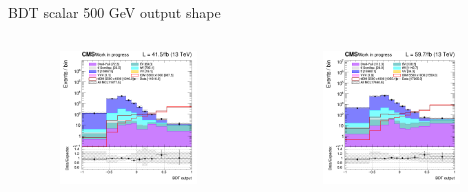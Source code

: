 \documentclass[8pt]{beamer}
\begin{document}
\begin{frame}{BDT scalar 500 GeV output shape}
\begin{columns}
\begin{column}{0.33\textwidth}
\begin{center}
     			\includegraphics[width=1.0\textwidth, height=100pt]{figs/2017/SmearSR-ttDM-scalar500/log_cratio_topCR_ll_ST_BDT_output_scalar500_customBinsAttempt7.png}
    		\end{center}		
		\end{column} 
		\begin{column}{0.33\textwidth}
			\begin{center}
			\begin{block}{}\end{block}	
     			\includegraphics[width=1.0\textwidth, height=100pt]{figs/2018/SmearSR-ttDM-scalar500/log_cratio_topCR_ll_ST_BDT_output_scalar500_customBinsAttempt7.png}
    		\end{center}		
		\end{column}
\end{columns}


\end{frame}
\end{document}
